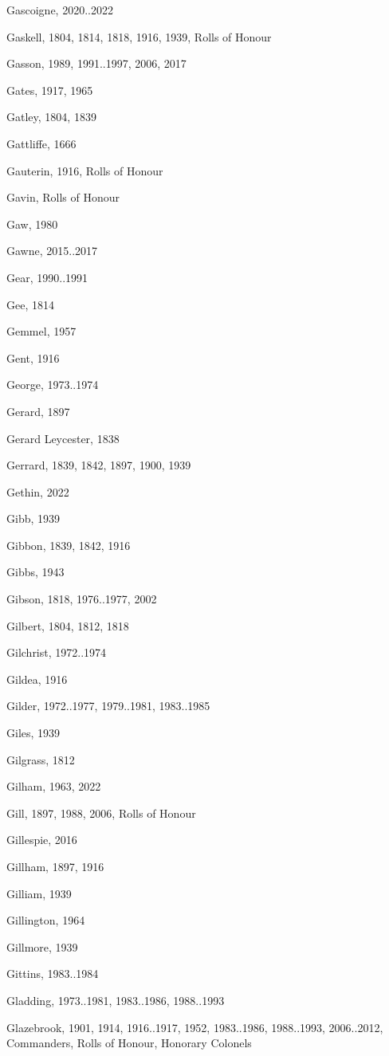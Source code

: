{\begin{theindex}
\item Gascoigne, 2020..2022
\item Gaskell, 1804, 1814, 1818, 1916, 1939, Rolls of Honour
\item Gasson, 1989, 1991..1997, 2006, 2017
\item Gates, 1917, 1965
\item Gatley, 1804, 1839
\item Gattliffe, 1666
\item Gauterin, 1916, Rolls of Honour
\item Gavin, Rolls of Honour
\item Gaw, 1980
\item Gawne, 2015..2017
\item Gear, 1990..1991
\item Gee, 1814
\item Gemmel, 1957
\item Gent, 1916
\item George, 1973..1974
\item Gerard, 1897
\item Gerard Leycester, 1838
\item Gerrard, 1839, 1842, 1897, 1900, 1939
\item Gethin, 2022
\item Gibb, 1939
\item Gibbon, 1839, 1842, 1916
\item Gibbs, 1943
\item Gibson, 1818, 1976..1977, 2002
\item Gilbert, 1804, 1812, 1818
\item Gilchrist, 1972..1974
\item Gildea, 1916
\item Gilder, 1972..1977, 1979..1981, 1983..1985
\item Giles, 1939
\item Gilgrass, 1812
\item Gilham, 1963, 2022
\item Gill, 1897, 1988, 2006, Rolls of Honour
\item Gillespie, 2016
\item Gillham, 1897, 1916
\item Gilliam, 1939
\item Gillington, 1964
\item Gillmore, 1939
\item Gittins, 1983..1984
\item Gladding, 1973..1981, 1983..1986, 1988..1993
\item Glazebrook, 1901, 1914, 1916..1917, 1952, 1983..1986, 1988..1993, 2006..2012, Commanders, Rolls of Honour, Honorary Colonels

\end{theindex}}
